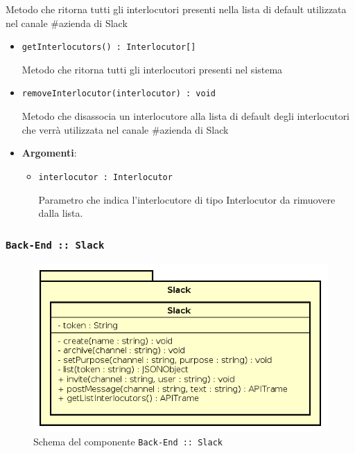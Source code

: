 \documentclass[../DefinizioneDiProdotto.tex]{subfiles}
\begin{document}
\begin{itemize}
\begin{itemize}
\begin{itemize}
	 Metodo che ritorna tutti gli interlocutori presenti nella lista di default utilizzata nel canale \#azienda di Slack
	\end{itemize}\vspace{0.5em}
	\begin{itemize}
	\item \texttt{getInterlocutors() : Interlocutor[]}\

	 Metodo che ritorna tutti gli interlocutori presenti nel sistema
	\end{itemize}\vspace{0.5em}
	\begin{itemize}
	\item \texttt{removeInterlocutor(interlocutor) : void}\

	 Metodo che disassocia un interlocutore alla lista di default degli interlocutori che verrà utilizzata nel canale \#azienda di Slack

	\item \textbf{Argomenti}:
	\begin{itemize}
	\item \texttt{interlocutor : Interlocutor}\

	 Parametro che indica l'interlocutore di tipo Interlocutor da rimuovere dalla lista.
	\end{itemize}
	\end{itemize}\vspace{0.5em}
	\end{itemize}\end{itemize}

	\newpage
	\subsubsection{ \texttt{Back-End :: Slack}}
	\begin{figure}[!h]
		\centering
		\includegraphics[scale=0.7]{Architettura/Back-End/Slack.png}
		\caption{Schema del componente \texttt{Back-End :: Slack}}
	\end{figure}
\end{document}
